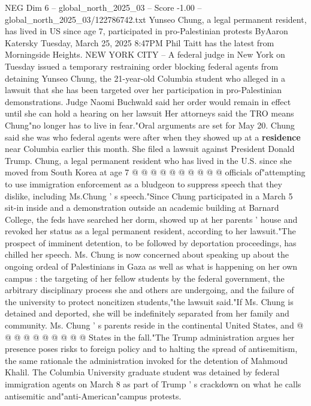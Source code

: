 \begin{textsample}{NEG Dim 6 – global\_north\_2025\_03 – Score -1.00 – global\_north\_2025\_03/122786742.txt}  \label{ex:f6_neg_227}
Yunseo Chung, a legal permanent resident, has lived in US since age 7, participated in pro-Palestinian protests ByAaron Katersky Tuesday, March 25, 2025 8:47PM Phil Taitt has the latest from Morningside Heights.
NEW YORK CITY -- A federal judge in New York on Tuesday issued a temporary restraining order blocking federal agents from detaining Yunseo Chung, the 21-year-old Columbia student who alleged in a lawsuit that she has been targeted over her participation in pro-Palestinian demonstrations.
Judge Naomi Buchwald said her order would remain in effect until she can hold a hearing on her lawsuit Her attorneys said the TRO means Chung"no longer has to live in fear."Oral arguments are set for May 20.
Chung said she was who federal agents were after when they showed up at a \textbf{residence} near Columbia earlier this month.
She filed a lawsuit against President Donald Trump.
Chung, a legal permanent resident who has lived in the U.S. since she moved from South Korea at age 7 @ @ @ @ @ @ @ @ @ @ officials of"attempting to use immigration enforcement as a bludgeon to suppress speech that they dislike, including Ms.Chung ' s speech."Since Chung participated in a March 5 sit-in inside and a demonstration outside an academic building at Barnard College, the feds have searched her dorm, showed up at her parents ' house and revoked her status as a legal permanent resident, according to her lawsuit."The prospect of imminent detention, to be followed by deportation proceedings, has chilled her speech.
Ms.
Chung is now concerned about speaking up about the ongoing ordeal of Palestinians in Gaza as well as what is happening on her own campus : the targeting of her fellow students by the federal government, the arbitrary disciplinary process she and others are undergoing, and the failure of the university to protect noncitizen students,"the lawsuit said."If Ms.
Chung is detained and deported, she will be indefinitely separated from her family and community.
Ms.
Chung ' s parents reside in the continental United States, and @ @ @ @ @ @ @ @ @ @ States in the fall."The Trump administration argues her presence poses risks to foreign policy and to halting the spread of antisemitism, the same rationale the administration invoked for the detention of Mahmoud Khalil.
The Columbia University graduate student was detained by federal immigration agents on March 8 as part of Trump ' s crackdown on what he calls antisemitic and"anti-American"campus protests.

\end{textsample}
